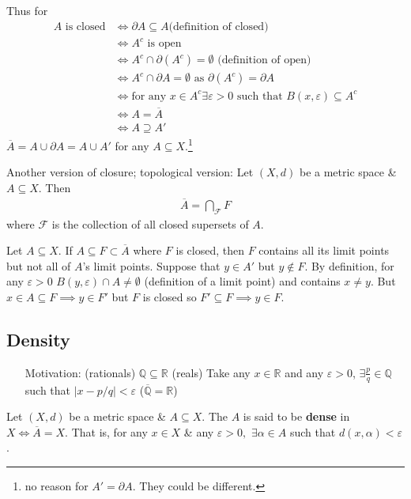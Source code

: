 \documentclass[10pt]{article}
\begin{document}
Thus for
\begin{align*}
    A\text{ is closed}&\iff\partial A\subseteq A \text{(definition of closed)}\\
    &\iff A^{c}\text{ is open}\\
    &\iff A^{c}\cap\partial(A^{c})=\emptyset\text{ (definition of open)}\\
    &\iff A^{c}\cap\partial A=\emptyset\text{ as }\partial(A^{c})=\partial A\\
    &\iff \text{for any }x\in A^{c}\exists\varepsilon>0\text{ such that }B(x,\varepsilon)\subseteq A^{c}\\
    &\iff A=\overline{A}\\
    &\iff A\supseteq A'
\end{align*}
$\overline{A}=A\cup\partial A=A\cup A'$ for any $A\subseteq X$.\footnote{no reason for $A'=\partial A$. They could be different.}

Another version of closure; topological version: Let $(X,d)$ be a metric space \& $A\subseteq X$. Then
\begin{align*}
    \overline{A}=\bigcap_{\mathcal{F}}F
\end{align*}
where $\mathcal{F}$ is the collection of all closed supersets of $A$.

Let $A\subseteq X$. If $A\subseteq F\subset\overline{A}$ where $F$ is closed, then $F$ contains all its limit points but not all of $A$'s limit points. Suppose that $y\in A'$ but $y\notin F$. By definition, for any $\varepsilon>0$ $B(y,\varepsilon)\cap A\neq\emptyset$ (definition of a limit point) and contains $x\neq y$. But $x\in A\subseteq F\implies y\in F'$ but $F$ is closed so $F'\subseteq F\implies y\in F$.

\subsection{Density}
\begin{itemize}
    \item[Motivation:] (rationals) $\mathbb{Q}\subseteq\mathbb{R}$ (reals)
    \subitem Take any $x\in\mathbb{R}$ and any $\varepsilon>0$, $\exists\frac{p}{q}\in\mathbb{Q}$ such that $|x-p/q|<\varepsilon$ ($\overline{\mathbb{Q}}=\mathbb{R}$)
\end{itemize}
Let $(X,d)$ be a metric space \& $A\subseteq X$. The $A$ is said to be \textbf{dense} in $X\iff\overline{A}=X$. That is, for any $x\in X$ \& any $\varepsilon>0,\,\,\exists\alpha\in A$ such that $d(x,\alpha)<\varepsilon$.
\end{document}
